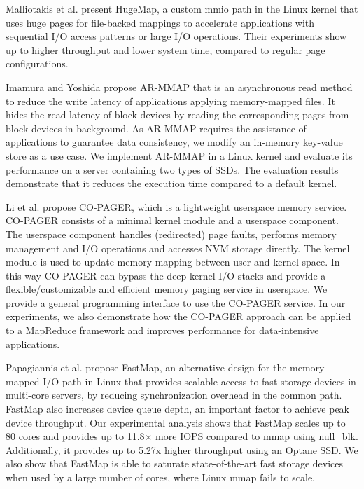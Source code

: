 Malliotakis et al. \cite{malliotakis2021hugemap} present HugeMap, a custom mmio path in the Linux kernel that uses huge pages for file-backed mappings to accelerate applications with sequential I/O access patterns or large I/O operations. Their experiments show up to higher throughput and lower system time, compared to regular page configurations.

Imamura and Yoshida \cite{imamura2019poster} propose AR-MMAP that is an asynchronous read method to reduce the write latency of applications applying memory-mapped files. It hides the read latency of block devices by reading the corresponding pages from block devices in background. As AR-MMAP requires the assistance of applications to guarantee data consistency, we modify an in-memory key-value store as a use case. We implement AR-MMAP in a Linux kernel and evaluate its performance on a server containing two types of SSDs. The evaluation results demonstrate that it reduces the execution time compared to a default kernel.

Li et al. \cite{li2019userland} propose CO-PAGER, which is a lightweight userspace memory service. CO-PAGER consists of a minimal kernel module and a userspace component. The userspace component handles (redirected) page faults, performs memory management and I/O operations and accesses NVM storage directly. The kernel module is used to update memory mapping between user and kernel space. In this way CO-PAGER can bypass the deep kernel I/O stacks and provide a flexible/customizable and efficient memory paging service in userspace. We provide a general programming interface to use the CO-PAGER service. In our experiments, we also demonstrate how the CO-PAGER approach can be applied to a MapReduce framework and improves performance for data-intensive applications.

Papagiannis et al. \cite{papagiannis2020optimizing} propose FastMap, an alternative design for the memory-mapped I/O path in Linux that provides scalable access to fast storage devices in multi-core servers, by reducing synchronization overhead in the common path. FastMap also increases device queue depth, an important factor to achieve peak device throughput. Our experimental analysis shows that FastMap scales up to 80 cores and provides up to 11.8× more IOPS compared to mmap using null\_blk. Additionally, it provides up to 5.27x higher throughput using an Optane SSD. We also show that FastMap is able to saturate state-of-the-art fast storage devices when used by a large number of cores, where Linux mmap fails to scale.

